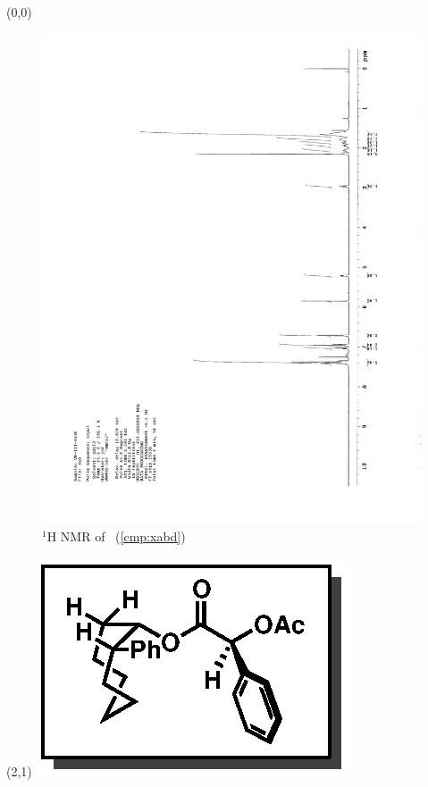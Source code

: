 \begin{textblock}{20}(0,0)
\begin{figure}[htb]
\caption{$^1$H NMR of \CMPxabd\ (\ref{cmp:xabd})}
\includegraphics[scale=0.75, trim = 0mm 0mm 0mm 5mm,
clip]{chp_asymmetric/images/nmr/xabdH}
\vspace{-100pt}
\end{figure}
\end{textblock}
\begin{textblock}{1}(2,1)
\includegraphics[scale=0.8, angle=90]{chp_asymmetric/images/xabd}
\end{textblock}
